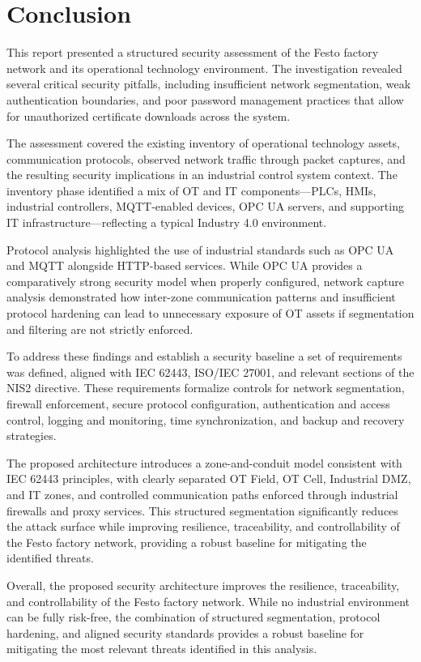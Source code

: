 \documentclass{report}
\begin{document}
\chapter{Conclusion}

This report presented a structured security assessment of the Festo factory network and its operational technology environment. The investigation revealed several critical security pitfalls, including insufficient network segmentation, weak authentication boundaries, and poor password management practices that allow for unauthorized certificate downloads across the system.

The assessment covered the existing inventory of operational technology assets, communication protocols, observed network traffic through packet captures, and the resulting security implications in an industrial control system context. The inventory phase identified a mix of OT and IT components—PLCs, HMIs, industrial controllers, MQTT-enabled devices, OPC UA servers, and supporting IT infrastructure—reflecting a typical Industry 4.0 environment.

Protocol analysis highlighted the use of industrial standards such as OPC UA and MQTT alongside HTTP-based services. While OPC UA provides a comparatively strong security model when properly configured, network capture analysis demonstrated how inter-zone communication patterns and insufficient protocol hardening can lead to unnecessary exposure of OT assets if segmentation and filtering are not strictly enforced.

To address these findings and establish a security baseline a set of requirements was defined, aligned  with IEC 62443, ISO/IEC 27001, and relevant sections of the NIS2 directive. These requirements formalize controls for network segmentation, firewall enforcement, secure protocol configuration, authentication and access control, logging and monitoring, time synchronization, and backup and recovery strategies.

The proposed architecture introduces a zone-and-conduit model consistent with IEC 62443 principles, with clearly separated OT Field, OT Cell, Industrial DMZ, and IT zones, and controlled communication paths enforced through industrial firewalls and proxy services. This structured segmentation significantly reduces the attack surface while improving resilience, traceability, and controllability of the Festo factory network, providing a robust baseline for mitigating the identified threats.

Overall, the proposed security architecture improves the resilience, traceability, and controllability of the Festo factory network. While no industrial environment can be fully risk-free, the combination of structured segmentation, protocol hardening, and aligned security standards provides a robust baseline for mitigating the most relevant threats identified in this analysis.
\end{document}
